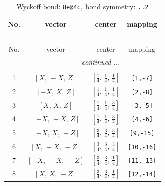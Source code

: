 \documentclass[fleqn,8pt]{jsarticle}
\begin{document}
\begin{longtable}{cccc}
\caption{Wyckoff bond: {\tt 8e@4c}, bond symmetry: {\tt ..2}}
 \\
 \hline \hline
No. & vector & center & mapping \\ \hline \endfirsthead

\multicolumn{3}{l}{\tablename\ \thetable{}} \\
 \hline \hline
No. & vector & center & mapping \\ \hline \endhead

 \hline \hline
\multicolumn{3}{r}{\footnotesize\it continued ...} \\ \endfoot

 \hline \hline
\multicolumn{3}{r}{} \\ \endlastfoot

1 & $\left[ X,\, - X,\, Z \right]$ & $\left[ \frac{1}{4},\, \frac{1}{4},\, \frac{1}{4} \right]$ & {\tt [1,-7]} \\ \hline
2 & $\left[ - X,\, X,\, Z \right]$ & $\left[ \frac{1}{4},\, \frac{1}{4},\, \frac{1}{4} \right]$ & {\tt [2,-8]} \\ \hline
3 & $\left[ X,\, X,\, Z \right]$ & $\left[ \frac{1}{4},\, \frac{1}{4},\, \frac{3}{4} \right]$ & {\tt [3,-5]} \\ \hline
4 & $\left[ - X,\, - X,\, Z \right]$ & $\left[ \frac{1}{4},\, \frac{1}{4},\, \frac{3}{4} \right]$ & {\tt [4,-6]} \\ \hline
5 & $\left[ - X,\, X,\, - Z \right]$ & $\left[ \frac{3}{4},\, \frac{3}{4},\, \frac{3}{4} \right]$ & {\tt [9,-15]} \\ \hline
6 & $\left[ X,\, - X,\, - Z \right]$ & $\left[ \frac{3}{4},\, \frac{3}{4},\, \frac{3}{4} \right]$ & {\tt [10,-16]} \\ \hline
7 & $\left[ - X,\, - X,\, - Z \right]$ & $\left[ \frac{3}{4},\, \frac{3}{4},\, \frac{1}{4} \right]$ & {\tt [11,-13]} \\ \hline
8 & $\left[ X,\, X,\, - Z \right]$ & $\left[ \frac{3}{4},\, \frac{3}{4},\, \frac{1}{4} \right]$ & {\tt [12,-14]} \\
\end{longtable}
\renewcommand{\arraystretch}{1.2}
\end{document}
